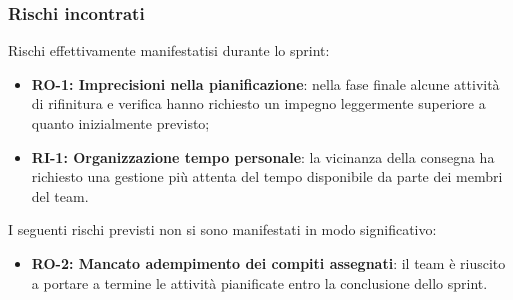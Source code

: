 \documentclass[a4paper,12pt]{article}
\begin{document}
    \subsubsection{Rischi incontrati}{
        Rischi effettivamente manifestatisi durante lo sprint:
        \begin{itemize}
            \item \textbf{RO-1: Imprecisioni nella pianificazione}: nella fase finale alcune attività di rifinitura e verifica hanno richiesto un impegno leggermente superiore a quanto inizialmente previsto;
            \item \textbf{RI-1: Organizzazione tempo personale}: la vicinanza della consegna ha richiesto una gestione più attenta del tempo disponibile da parte dei membri del team.
        \end{itemize}

        I seguenti rischi previsti non si sono manifestati in modo significativo:
        \begin{itemize}
            \item \textbf{RO-2: Mancato adempimento dei compiti assegnati}: il team è riuscito a portare a termine le attività pianificate entro la conclusione dello sprint.
        \end{itemize}
    }
\end{document}
